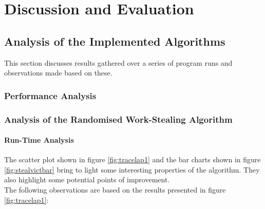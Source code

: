 \chapter{Discussion and Evaluation}
\section{Analysis of the Implemented Algorithms}

This section discusses results gathered over a series of program runs and observations made based on these. 

\subsection{Performance Analysis}




\subsection{Analysis of the Randomised Work-Stealing Algorithm}

\subsubsection*{Run-Time Analysis}

The scatter plot shown in figure \ref{fig:tracelap1} and the bar charts shown in figure \ref{fig:stealvictbar} 
bring to light some interesting properties of the algorithm.
They also highlight some potential points of improvement.
\\



The following observations are based on the results presented in figure \ref{fig:tracelap1}:

